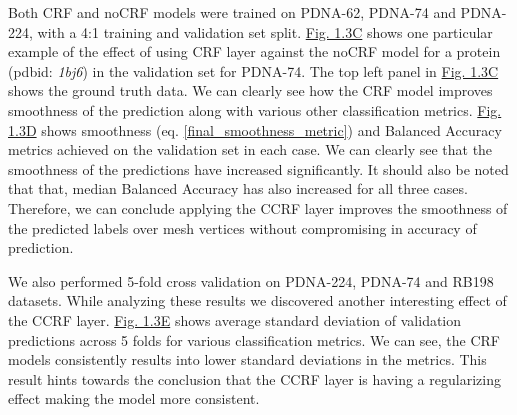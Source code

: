 Both CRF and noCRF models were trained on PDNA-62, PDNA-74 and PDNA-224, with a 4:1 training and validation set
        split. \hyperref[fig:ccrf]{Fig. 1.3C} shows one particular example 
        of the effect of using CRF layer against the noCRF model for a protein (pdbid: \textit{1bj6}) in the validation set
        for PDNA-74. The top left panel in \hyperref[fig:ccrf]{Fig. 1.3C} shows the
        ground truth data. We can clearly see how the CRF model improves smoothness of the
        prediction along with various other classification metrics. \hyperref[fig:ccrf]{Fig. 1.3D}
        shows smoothness (eq.
        \ref{final_smoothness_metric}) and Balanced Accuracy  metrics achieved on the validation set
        in each case. We can clearly see that the smoothness of the predictions have increased significantly.
        It should also be noted that that, median Balanced Accuracy has also increased for all three
        cases. Therefore, we can conclude applying the CCRF layer improves the smoothness of the
        predicted labels over mesh vertices without compromising in accuracy of prediction. 

        We also performed 5-fold cross validation on PDNA-224, PDNA-74 and RB198 datasets. While
        analyzing these results we discovered another interesting effect of the CCRF layer.
        \hyperref[fig:ccrf]{Fig. 1.3E} shows average standard deviation of validation predictions
        across 5 folds for various classification metrics. We can see, the CRF models consistently
        results into lower standard deviations in the metrics. This result hints towards the
        conclusion that the CCRF layer is having a
        regularizing effect making the model more consistent.

